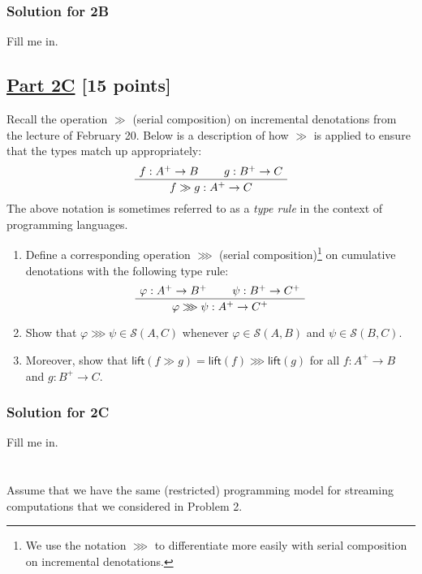 \documentclass[11pt]{article}
\newcommand{\kplus}{^+}
\renewcommand{\phi}{\varphi}
\renewcommand{\S}{\mathcal{S}}
\newcommand{\serial}{\gg}
\newcommand{\cserial}{\ggg}
\newcommand{\lift}{\mathsf{lift}}
\begin{document}
\subsubsection*{Solution for 2B}

Fill me in.

\subsection*{\underline{Part 2C} [15 points]}

Recall the operation $\serial$ (serial composition) on incremental denotations from the lecture of February 20. Below is a description of how $\serial$ is applied to ensure that the types match up appropriately:
\[
  \AxiomC{$f: A\kplus \to B$}
  \AxiomC{$g: B\kplus \to C$}
  \BinaryInfC{$f \serial g: A\kplus \to C$}
  \DisplayProof
\]
The above notation is sometimes referred to as a \emph{type rule} in the context of programming languages.
\begin{enumerate}[(1)]
\item
Define a corresponding operation $\cserial$ (serial composition)\footnote{We use the notation $\cserial$ to differentiate more easily with serial composition on incremental denotations.} on cumulative denotations with the following type rule:
\[
  \AxiomC{$\phi: A\kplus \to B\kplus$}
  \AxiomC{$\psi: B\kplus \to C\kplus$}
  \BinaryInfC{$\phi \cserial \psi: A\kplus \to C\kplus$}
  \DisplayProof
\]
\item
Show that $\phi \cserial \psi \in \S(A,C)$ whenever $\phi \in \S(A,B)$ and $\psi \in \S(B,C)$.
\item
Moreover, show that
$
  \lift(f \serial g) =
  \lift(f) \cserial \lift(g)
$
for all $f: A\kplus \to B$ and $g: B\kplus \to C$.
\end{enumerate}

\subsubsection*{Solution for 2C}

Fill me in.

\clearpage %
\section*{}

Assume that we have the same (restricted) programming model for streaming computations that we considered in Problem 2.
\end{document}
